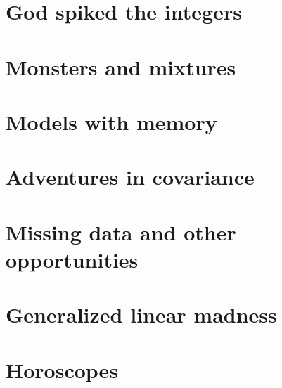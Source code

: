 \documentclass[
]{book}
\theoremstyle{definition}
\theoremstyle{definition}
\theoremstyle{definition}
\theoremstyle{definition}
\theoremstyle{remark}
\begin{document}
\hypertarget{god-spiked-the-integers}{%
\chapter{God spiked the integers}\label{god-spiked-the-integers}}

\hypertarget{monsters-and-mixtures}{%
\chapter{Monsters and mixtures}\label{monsters-and-mixtures}}

\hypertarget{models-with-memory}{%
\chapter{Models with memory}\label{models-with-memory}}

\hypertarget{adventures-in-covariance}{%
\chapter{Adventures in covariance}\label{adventures-in-covariance}}

\hypertarget{missing-data-and-other-opportunities}{%
\chapter{Missing data and other opportunities}\label{missing-data-and-other-opportunities}}

\hypertarget{generalized-linear-madness}{%
\chapter{Generalized linear madness}\label{generalized-linear-madness}}

\hypertarget{horoscopes}{%
\chapter{Horoscopes}\label{horoscopes}}

  
\end{document}
